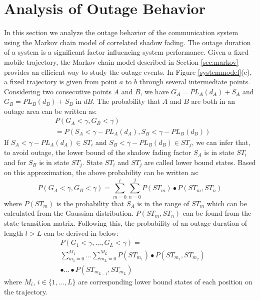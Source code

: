 \section{Analysis of Outage Behavior}
\label{sec:outage}
In this section we analyze the outage behavior of the communication system using the Markov chain model of correlated shadow fading. The outage duration of a system is a significant factor influencing system performance. Given a fixed mobile trajectory, the Markov chain model described in Section \ref{sec:markov} provides an efficient way to study the outage events. In Figure \ref{systemmodel}(c), a fixed trajectory is given from point $a$ to $b$ through several intermediate points. Considering two consecutive points $A$ and $B$, we have $G_{A}=PL_{A}(d_{A})+S_{A}$ and $G_{B}=PL_{B}(d_{B})+S_{B}$ in $dB$. The probability that $A$ and $B$ are both in an outage area can be written as:
\begin{equation}
\begin{split}
&P(G_{A}<\gamma, G_{B}<\gamma) \\
&= P(S_{A}<\gamma-PL_{A}(d_{A}), S_{B}<\gamma-PL_{B}(d_{B}))
\end{split}
\end{equation}
If $S_{A}<\gamma-PL_{A}(d_{A}) \in ST_{i}$ and $S_{B}<\gamma-PL_{B}(d_{B}) \in ST_{j}$, we can infer that, to avoid outage, the lower bound of the shadow fading factor $S_{A}$ is in state $ST_{i}$ and for $S_{B}$ is in state $ST_{j}$. State $ST_{i}$ and $ST_{j}$ are called lower bound states. Based on this approximation, the above probability can be written as:
\begin{equation}
P(G_{A}<\gamma, G_{B}<\gamma)=\sum_{m=0}^{i}\sum_{n=0}^{j} P(ST_{m})\bullet P(ST_{m},ST_{n})
\end{equation}
where $P(ST_{m})$ is the probability that $S_{A}$ is in the range of $ST_{m}$ which can be calculated from the Gaussian distribution. $P(ST_{m},ST_{n})$ can be found from the state transition matrix. Following this, the probability of an outage duration of length $l>L$ can be derived in below:
\begin{equation}
\begin{split}
&P(G_{1}<\gamma,\dots,G_{L}<\gamma)=\\
&\sum_{m_{1}=0}^{M_{1}}\dots\sum_{m_{L}=0}^{M_{L}} P(ST_{m_{1}})\bullet P(ST_{m_{1}},ST_{m_{2}})\\
&\bullet\dots\bullet P(ST_{m_{L-1}},ST_{m_{L}})
\end{split}
\end{equation}
where $M_{i}$, $i\in\{1,\dots,L\}$ are corresponding lower bound states of each position on the trajectory.
